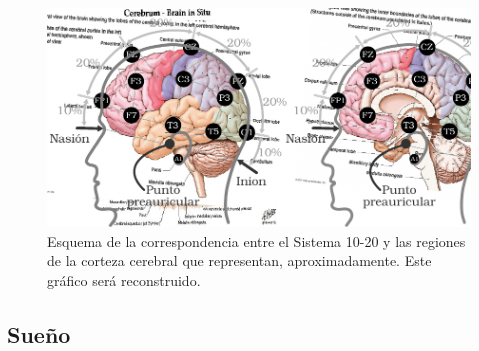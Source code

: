 \begin{figure}
\centering
\includegraphics[width=\linewidth]{./img_diagramas/cerebro_1020.pdf} 
\caption{Esquema de la correspondencia entre el Sistema 10-20 y las regiones de la corteza
cerebral que representan, aproximadamente. Este gráfico será reconstruido.
}
\label{corresponde_1020}
\end{figure}


\subsection{Sueño}

%

